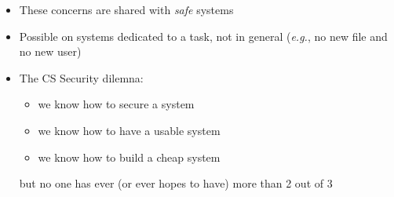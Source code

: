 \begin{reveals}
\begin{frame}
  \pause

  \begin{itemize}
  \item These concerns are shared with \emph{safe} systems
  \item Possible on systems dedicated to a task, not in general
    (\textit{e.g.}, no new file and no new user)
  \item The CS Security dilemna:
    \begin{itemize}
    \item we know how to secure a system
    \item we know how to have a usable system
    \item we know how to build a cheap system
    \end{itemize}
    but no one has ever (or ever hopes to have) more than 2 out of 3
  \end{itemize}

\end{frame}








\end{reveals}

